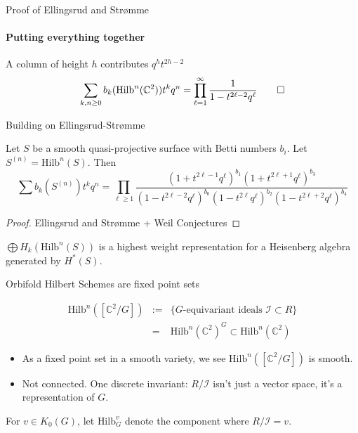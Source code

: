 \documentclass{beamer}
\newcommand{\Hilb}{\textrm{Hilb}}
\newcommand{\C}{\mathbb{C}}
\begin{document}
\begin{frame}{Proof of Ellingsrud and Str\o mme}
\framesubtitle{Putting everything together}

\begin{center}
\end{center}

A column of height $h$ contributes $q^ht^{2h-2}$
$$\sum_{k,n \geq 0} b_k(\Hilb^n(\C^2))t^k q^n=\prod_{\ell=1}^\infty \frac{1}{1-t^{2\ell-2}q^\ell}\qed$$


\end{frame}

\begin{frame}{Building on Ellingsrud-Str\o mme}

\begin{Theorem}[G\"ottsche, 1990]
Let $S$ be a smooth quasi-projective surface with Betti numbers $b_i$.  Let $S^{(n)}=\Hilb^n(S)$.  Then
$$\sum b_k(S^{(n)})t^k q^n=\prod_{\ell\geq 1} \frac{(1+t^{2\ell-1}q^\ell)^{b_1}(1+t^{2\ell+1}q^\ell)^{b_3}}{(1-t^{2\ell-2}q^\ell)^{b_0}(1-t^{2\ell}q^\ell)^{b_2}(1-t^{2\ell+2}q^\ell)^{b_4}}$$

\end{Theorem}
\begin{proof} Ellingsrud and Str\o mme + Weil Conjectures
\end{proof}
\begin{Theorem}
$\bigoplus H_k(\Hilb^n(S))$ is a highest weight representation for a Heisenberg algebra generated by $H^*(S)$.

\end{Theorem}

\end{frame}

\begin{frame}{Orbifold Hilbert Schemes are fixed point sets}


\begin{eqnarray*}
\Hilb^n([\C^2/G])&:=&\{\textrm{$G$-equivariant ideals } \mathcal{I}\subset R\} \\
&=&\Hilb^n(\C^2)^G\subset \Hilb^n(\C^2)
\end{eqnarray*}
\begin{itemize}
\item As a fixed point set in a smooth variety, we see $\Hilb^n([\C^2/G])$ is smooth.
\item Not connected.  One discrete invariant: $R/\mathcal{I}$ isn't just a vector space, it's a representation of $G$.  
\end{itemize}

For $v\in K_0(G)$, let $\Hilb^v_G$ denote the component where $R/\mathcal{I}=v$.

\end{frame}
\end{document}
